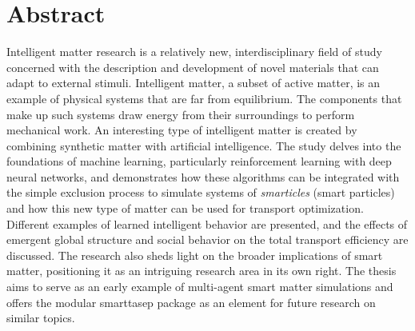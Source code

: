 \chapter*{Abstract}\label{chap:abstract}

Intelligent matter research is a relatively new, interdisciplinary field of study concerned with the description and development of novel materials that can adapt to external stimuli. Intelligent matter, a subset of active matter, is an example of physical systems that are far from equilibrium. The components that make up such systems draw energy from their surroundings to perform mechanical work. An interesting type of intelligent matter is created by combining synthetic matter with artificial intelligence. 
The study delves into the foundations of machine learning, particularly reinforcement learning with deep neural networks, and demonstrates how these algorithms can be integrated with the simple exclusion process to simulate systems of \textit{smarticles} (smart particles) and how this new type of matter can be used for transport optimization. 
Different examples of learned intelligent behavior are presented, and the effects of emergent global structure and social behavior on the total transport efficiency are discussed.
The research also sheds light on the broader implications of smart matter, positioning it as an intriguing research area in its own right. The thesis aims to serve as an early example of multi-agent smart matter simulations and offers the modular smarttasep package as an element for future research on similar topics.